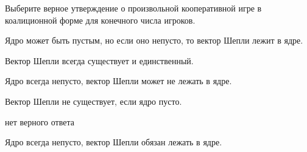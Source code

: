 
\begin{question}
Выберите верное утверждение о произвольной кооперативной игре в
коалиционной форме для конечного числа игроков.
\begin{answerlist}
  \item Ядро может быть пустым, но если оно непусто, то вектор Шепли лежит в
ядре.
  \item Вектор Шепли всегда существует и единственный.
  \item Ядро всегда непусто, вектор Шепли может не лежать в ядре.
  \item Вектор Шепли не существует, если ядро пусто.
  \item нет верного ответа
  \item Ядро всегда непусто, вектор Шепли обязан лежать в ядре.
\end{answerlist}
\end{question}


